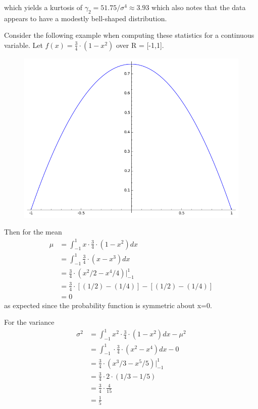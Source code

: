 \documentclass[10pt,]{book}
\numberwithin{equation}{section}
\begin{document}
which yields a kurtosis of \(\gamma_2 = 51.75 / \sigma^4 \approx 3.93\) which also notes that the data appears to have a modestly bell-shaped distribution.%
\par
\hypertarget{p-738}{}%
Consider the following example when computing these statistics for a continuous variable. Let \(f(x) = \frac{3}{4} \cdot (1-x^2)\) over R = [-1,1]. \begin{figure}\centering\includegraphics[width=1\linewidth]{images/ContinuousDistributionExample.png}
\end{figure}%
\par
\hypertarget{p-739}{}%
Then for the mean%
\begin{align*}
\mu & = \int_{-1}^1 x \cdot \frac{3}{4} \cdot (1-x^2) dx\\
& = \int_{-1}^1 \frac{3}{4} \cdot (x-x^3) dx\\
& = \frac{3}{4} \cdot (x^2/2-x^4/4) \big |_{-1}^1\\
& = \frac{3}{4} \cdot [(1/2)-(1/4)] - [(1/2) - (1/4)]\\
& = 0
\end{align*}
as expected since the probability function is symmetric about x=0.%
\par
\hypertarget{p-740}{}%
For the variance%
\begin{align*}
\sigma^2 & = \int_{-1}^1 x^2 \cdot \frac{3}{4} \cdot (1-x^2) dx - \mu^2\\
& = \int_{-1}^1 \cdot \frac{3}{4} \cdot (x^2-x^4) dx - 0\\
& = \frac{3}{4} \cdot (x^3 /3 -x^5 / 5) \big |_{-1}^1\\
& = \frac{3}{4} \cdot 2 \cdot (1/3-1/5)\\
& = \frac{3}{4} \cdot \frac{4}{15}\\
& = \frac{1}{5}
\end{align*}
\end{document}

